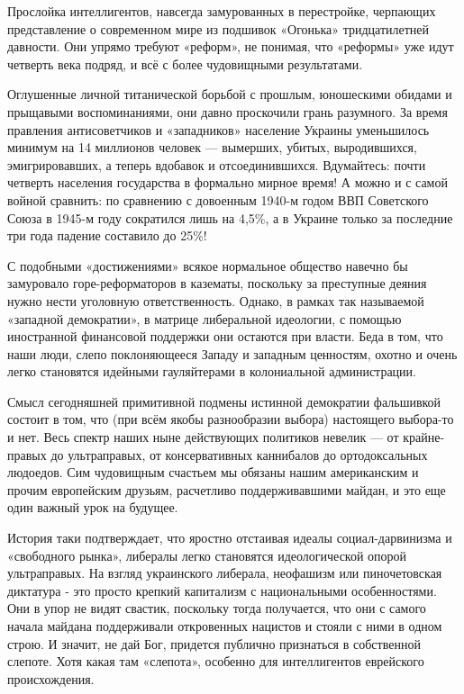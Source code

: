 Прослойка интеллигентов, навсегда замурованных в перестройке, черпающих
представление о современном мире из подшивок «Огонька» тридцатилетней давности.
Они упрямо требуют «реформ», не понимая, что «реформы» уже идут четверть века
подряд, и всё с более чудовищными результатами. 

Оглушенные личной титанической борьбой с прошлым, юношескими обидами и
прыщавыми воспоминаниями, они давно проскочили грань разумного. За время
правления антисоветчиков и «западников» население Украины уменьшилось минимум
на 14 миллионов человек — вымерших, убитых, выродившихся, эмигрировавших, а
теперь вдобавок и отсоединившихся. Вдумайтесь: почти четверть населения
государства в формально мирное время! А можно и с самой войной сравнить: по
сравнению с довоенным 1940-м годом ВВП Советского Союза в 1945-м году
сократился лишь на 4,5\%, а в Украине только за последние три года падение
составило до 25\%!

С подобными «достижениями» всякое нормальное общество навечно бы замуровало
горе-реформаторов в казематы, поскольку за преступные деяния нужно нести
уголовную ответственность. Однако, в рамках так называемой «западной
демократии», в матрице либеральной идеологии, с помощью иностранной финансовой
поддержки они остаются при власти. Беда в том, что наши люди, слепо
поклоняющееся Западу и западным ценностям, охотно и очень легко становятся
идейными гауляйтерами в колониальной администрации.

Смысл сегодняшней примитивной подмены истинной демократии фальшивкой состоит в
том, что (при всём якобы разнообразии выбора) настоящего выбора-то и нет. Весь
спектр наших ныне действующих политиков невелик — от крайне-правых до
ультраправых, от консервативных каннибалов до ортодоксальных людоедов. Сим
чудовищным счастьем мы обязаны нашим американским и прочим европейским друзьям,
расчетливо поддерживавшими майдан, и это еще один важный урок на будущее.

История таки подтверждает, что яростно отстаивая идеалы социал-дарвинизма и
«свободного рынка», либералы легко становятся идеологической опорой
ультраправых. На взгляд украинского либерала, неофашизм или пиночетовская
диктатура - это просто крепкий капитализм с национальными особенностями. Они в
упор не видят свастик, поскольку тогда получается, что они с самого начала
майдана поддерживали откровенных нацистов и стояли с ними в одном строю. И
значит, не дай Бог, придется публично признаться в собственной слепоте. Хотя
какая там «слепота», особенно для интеллигентов еврейского происхождения.

